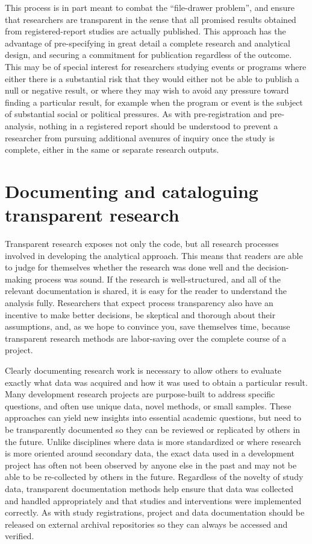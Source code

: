 This process is in part meant to combat the ``file-drawer problem'',\cite{simonsohn2014p}
and ensure that researchers are transparent in the sense that
all promised results obtained from registered-report studies are actually published.
This approach has the advantage of pre-specifying in great detail
a complete research and analytical design,
and securing a commitment for publication regardless of the outcome.
This may be of special interest for researchers
studying events or programs where either there is a substantial risk
that they would either not be able to publish a null or negative result,
or where they may wish to avoid any pressure toward finding a particular result,
for example when the program or event is the subject of substantial social or political pressures.
As with pre-registration and pre-analysis,
nothing in a registered report should be understood
to prevent a researcher from pursuing additional avenures of inquiry
once the study is complete, either in the same or separate research outputs.

\section{Documenting and cataloguing transparent research}
Transparent research exposes not only the code,
but all research processes involved in developing the analytical approach.
This means that readers are able to judge for themselves whether the research was done well
and the decision-making process was sound.
If the research is well-structured, and all of the relevant documentation
is shared, it is easy for the reader to understand the analysis fully.
Researchers that expect process transparency also have an incentive to make better decisions,
be skeptical and thorough about their assumptions,
and, as we hope to convince you, save themselves time,
because transparent research methods are labor-saving over the complete course of a project.

Clearly documenting research work is necessary
to allow others to evaluate exactly what data was acquired and how it was used
to obtain a particular result.
Many development research projects are purpose-built
to address specific questions,
and often use unique data, novel methods, or small samples.
These approaches can yield new insights into essential academic questions,
but need to be transparently documented so they can be reviewed
or replicated by others in the future.\cite{duvendack2017meant}
Unlike disciplines where data is more standardized
or where research is more oriented around secondary data,
 the exact data used in a development project
has often not been observed by anyone else in the past
and may not be able to be re-collected by others in the future.
Regardless of the novelty of study data,
transparent documentation methods help ensure
that data was collected and handled appropriately
and that studies and interventions were implemented correctly.
As with study registrations, project and data documentation
should be released on external archival repositories
so they can always be accessed and verified.

